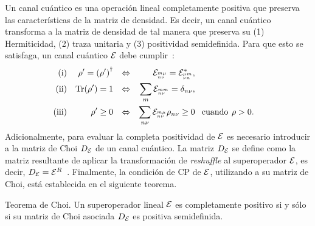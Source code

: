 Un canal cuántico es una operación lineal completamente
positiva que preserva las características de la matriz de densidad.
Es decir, un canal cuántico transforma a la matriz de densidad de
tal manera que preserva su (1) Hermiticidad, (2) traza unitaria y 
(3) positividad semidefinida. Para que esto se satisfaga, un 
canal cuántico $\mathcal{E}$ debe cumplir~\cite{bengtsson_zyczkowski_2017}:
\begin{align}
\text{(i)}&& \rho'=\qty(\rho')^{\dagger}&&\Leftrightarrow
    && \mathcal{E}_{{}^{m\mu}_{n\nu}}=\mathcal{E}_{{}^{\mu m}_{\nu n}}^*,&&
    \label{eq:H-condition}\\
\text{(ii)}&&\Tr(\rho')=1
    &&\Leftrightarrow&&  \sum_{m}\mathcal{E}_{{}^{mm}_{n\nu}}=\delta_{n\nu},\\     
\text{(iii)}&&\rho'\geq0
    &&\Leftrightarrow&&  \sum_{n\nu}\mathcal{E}_{{{}^{m\mu}_{n\nu}}}\rho_{n\nu}\geq0 &
    \text{\hspace{8pt}cuando\hspace{4pt}} \rho>0.
    \label{eq:positivity-condition}
\end{align}
Adicionalmente, para evaluar la completa positividad de $\mathcal{E}$ es 
necesario introducir a la matriz de Choi $D_{\mathcal{E}}$ de un canal cuántico.
La matriz $D_{\mathcal{E}}$ se define como la matriz resultante de 
aplicar la transformación de \textit{reshuffle} al superoperador $\mathcal{E}$,
es decir, $D_{\mathcal{E}}=\mathcal{E}^{R}$~\cite{bengtsson_zyczkowski_2017}.
Finalmente, la condición de CP de $\mathcal{E}$, utilizando a su matriz de Choi, 
está establecida en el siguiente teorema.
\begin{thm}{Teorema de Choi.}\label{thm:choi-CP}
Un superoperador lineal $\mathcal{E}$ es completamente positivo si y sólo si 
su matriz de Choi asociada $D_{\mathcal{E}}$ es positiva semidefinida.
\end{thm}
